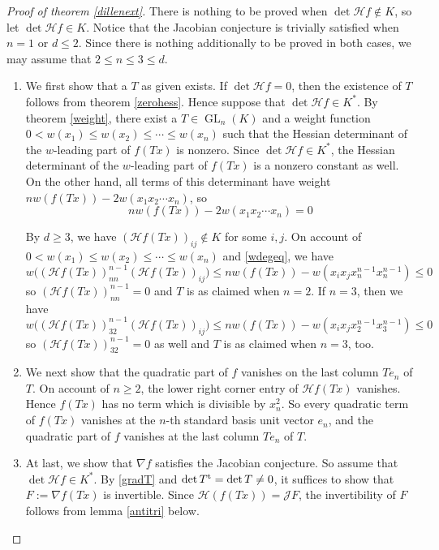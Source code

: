 \documentclass[10pt]{article}
\theoremstyle{remark}
\theoremstyle{definition}
\newcommand{\jac}{{\mathcal J}}
\newcommand{\hess}{{\mathcal H}}
\newcommand{\grad}{\nabla}
\newcommand{\GL}{\operatorname{GL}}
\newcommand{\tp}{^{\rm t}}
\begin{document}
\begin{proof}[Proof of theorem \ref{dillenext}] 
There is nothing to be proved when $\det \hess f \notin K$, so let $\det \hess f \in K$. 
Notice that the Jacobian conjecture is trivially satisfied when $n = 1$ or $d \le 2$. 
Since there is nothing additionally to be proved in both cases, we may assume that 
$2 \le n \le 3 \le d$.
\begin{enumerate}

\item[i)]
We first show that a $T$ as given exists. If $\det \hess f = 0$, then the existence of $T$ follows
from theorem \ref{zerohess}. Hence suppose that $\det \hess f \in K^{*}$. By theorem \ref{weight},
there exist a $T \in \GL_n(K)$ and a weight function $0 < w(x_1) \le w(x_2) \le \cdots \le w(x_n)$ 
such that the Hessian determinant of the $w$-leading part of $f(Tx)$ is nonzero. Since 
$\det \hess f \in K^{*}$, the Hessian determinant of the $w$-leading part of $f(Tx)$ is a nonzero
constant as well. On the other hand, all terms of this determinant have weight $n w(f(Tx)) - 
2w(x_1 x_2 \cdots x_n)$, so 
\begin{equation} \label{wdegeq}
n w(f(Tx)) - 2w(x_1 x_2 \cdots x_n) = 0
\end{equation}

By $d \ge 3$, we have $(\hess f(Tx))_{ij} \notin K$ for some $i,j$. 
On account of $0 < w(x_1) \le w(x_2) \le \cdots \le w(x_n)$ and \eqref{wdegeq}, we have 
$$
w\big((\hess f(Tx))_{nn}^{n-1} (\hess f(Tx))_{ij}\big) 
\le n w(f(Tx)) - w(x_i x_j x_n^{n-1} x_n^{n-1}) \le 0
$$
so $(\hess f(Tx))_{nn}^{n-1} = 0$ and $T$ is as claimed when $n = 2$. If $n = 3$, then we have
$$
w\big((\hess f(Tx))_{32}^{n-1} (\hess f(Tx))_{ij}\big) 
\le n w(f(Tx)) - w(x_i x_j x_2^{n-1} x_3^{n-1}) \le 0
$$
so $(\hess f(Tx))_{32}^{n-1} = 0$ as well and $T$ is as claimed when $n = 3$, too.

\item[ii)]
We next show that the quadratic part of $f$ vanishes on the 
last column $Te_n$ of $T$. On account of $n \ge 2$, the lower right corner entry
of $\hess f(Tx)$ vanishes. Hence $f(Tx)$ has no term
which is divisible by $x_n^2$. So every quadratic term of $f(Tx)$ vanishes at the $n$-th
standard basis unit vector $e_n$, and the quadratic part of $f$ vanishes at the last column $T e_n$
of $T$.

\item[iii)]
At last, we show that $\grad f$ satisfies the Jacobian conjecture. 
So assume that $\det \hess f \in K^{*}$. By \eqref{gradT} and $\det T\tp = \det T \ne 0$, 
it suffices to show that $F := \grad f(Tx)$ is invertible. Since $\hess (f(Tx)) = \jac F$,
the invertibility of $F$ follows from lemma \ref{antitri} below. \qedhere

\end{enumerate} 
\end{proof}
\end{document}
